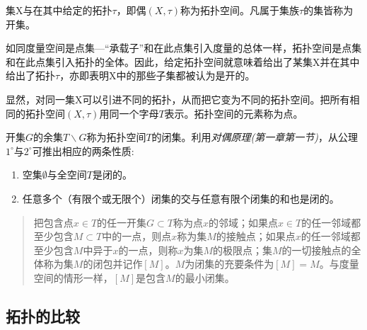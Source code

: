 集X与在其中给定的拓扑$\tau$，即偶$(X,\tau)$称为\textcolor[rgb]{1,0,0}{拓扑空间}。\textcolor[rgb]{1,0,0}{凡属于集族$\tau$的集皆称为开集}。

如同度量空间是点集---\textcolor[rgb]{1,0,0}{“承载子”}和在此点集引入度量的总体一样，拓扑空间是点集和在此点集引入拓扑的全体。因此，给定拓扑空间就意味着给出了某集X并在其中给出了拓扑$\tau$，亦即表明X中的那些子集都被认为是开的。

显然，对同一集X可以引进不同的拓扑，从而把它变为不同的拓扑空间。把所有相同的拓扑空间$(X,\tau)$用同一个字母$T$表示。拓扑空间的元素称为点。

开集$G$的余集$T\backslash G$称为拓扑空间$T$的闭集。利用\emph{对偶原理(第一章第一节)}，从公理$1^\circ$与$2^\circ$可推出相应的两条性质:
\begin{enumerate}
    \item 空集$\emptyset$与全空间$T$是闭的。
    \item 任意多个（有限个或无限个）闭集的交与任意有限个闭集的和也是闭的。
\end{enumerate}
\begin{quote}
    把包含点$x \in T$的任一开集$G \subset T$称为点$x$的\textcolor[rgb]{1,0,0}{邻域}；如果点$x \in T$的任一邻域都至少包含$M \subset T$中的一点，则点$x$称为集$M$的\textcolor[rgb]{1,0,0}{接触点}；如果点$x$的任一邻域都至少包含$M$中异于$x$的一点，则称$x$为集$M$的\textcolor[rgb]{1,0,0}{极限点}；集$M$的一切接触点的全体称为集$M$的\textcolor[rgb]{1,0,0}{闭包并记作$[M]$}。$M$为闭集的充要条件为$[M]=M$。与度量空间的情形一样，$[M]$是包含$M$的最小闭集。
\end{quote}
\subsection{拓扑的比较}






